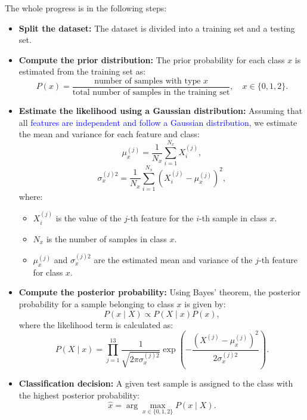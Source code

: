 The whole progress is in the following steps:
    \begin{itemize}
        \item \textbf{Split the dataset:}  
        The dataset is divided into a training set and a testing set.

        \item \textbf{Compute the prior distribution:}  
        The prior probability for each class \( x \) is estimated from the training set as:
        \begin{equation*}
            P(x) = \frac{\text{number of samples with type } x}{\text{total number of samples in the training set}}, \quad x \in \{0,1,2\}.
        \end{equation*}

        \item \textbf{Estimate the likelihood using a Gaussian distribution:}  
        Assuming that all \textcolor{blue}{features are independent and follow a Gaussian distribution}, we estimate the mean and variance for each feature and class:
        \begin{equation*}
            \mu_{x}^{(j)} = \frac{1}{N_x} \sum_{i=1}^{N_x} X_i^{(j)},
        \end{equation*}
        \begin{equation*}
            \sigma_{x}^{(j)2} = \frac{1}{N_x} \sum_{i=1}^{N_x} \left( X_i^{(j)} - \mu_{x}^{(j)} \right)^2,
        \end{equation*}
        where:
        \begin{itemize}
            \item \( X_i^{(j)} \) is the value of the \( j \)-th feature for the \( i \)-th sample in class \( x \).
            \item \( N_x \) is the number of samples in class \( x \).
            \item \( \mu_{x}^{(j)} \) and \( \sigma_{x}^{(j)2} \) are the estimated mean and variance of the \( j \)-th feature for class \( x \).
        \end{itemize}

        \item \textbf{Compute the posterior probability:}  
        Using Bayes' theorem, the posterior probability for a sample belonging to class \( x \) is given by:
        \begin{equation*}
            P(x \mid X) \propto P(X \mid x) P(x),
        \end{equation*}
        where the likelihood term is calculated as:
        \begin{equation*}
            P(X \mid x) = \prod_{j=1}^{13} \frac{1}{\sqrt{2\pi\sigma_{x}^{(j)2}}} \exp\left( -\frac{(X^{(j)} - \mu_{x}^{(j)})^2}{2\sigma_{x}^{(j)2}} \right).
        \end{equation*}

        \item \textbf{Classification decision:}  
        A given test sample is assigned to the class with the highest posterior probability:
        \begin{equation*}
            \hat{x} = \arg\max_{x \in \{0,1,2\}} P(x \mid X).
        \end{equation*}

    \end{itemize}